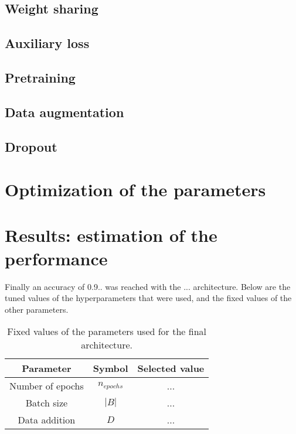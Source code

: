 \documentclass[10pt,conference,compsocconf]{IEEEtran}
\begin{document}
\subsection{Weight sharing}
\subsection{Auxiliary loss}
\subsection{Pretraining}
\subsection{Data augmentation}
\subsection{Dropout}


\section{Optimization of the parameters}


%

\section{Results: estimation of the performance}

Finally an accuracy of 0.9.. was reached with the ... architecture. %
Below are the tuned values of the hyperparameters that were used, and the fixed values of the other parameters.

\begin{table}[H]
\begin{tabular}{|c|c|c|}
  \hline
  Parameter & Symbol & Selected value \\
  \hline
  Number of epochs & $n_{epochs}$ & ... \\
  Batch size & $|B|$ & ...  \\
  Data addition & $D$ & ... \\
  \hline
\end{tabular}
\caption{Fixed values of the parameters used for the final architecture.}
\end{table}
\end{document}
